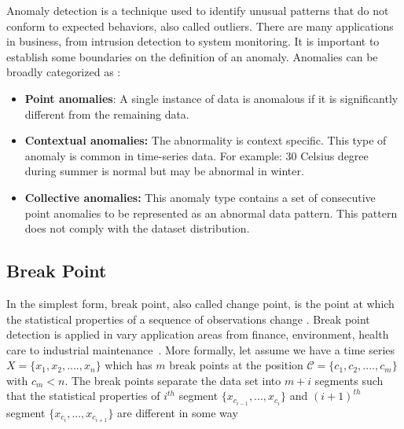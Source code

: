 Anomaly detection is a technique used to identify unusual patterns that do not conform to expected behaviors, also called outliers. There are many applications in business, from intrusion detection to system monitoring. It is important to establish some boundaries on the definition of an anomaly. Anomalies can be broadly categorized as \cite{chandola2009anomaly}:
\begin{itemize}
	\item \textbf{Point anomalies}: A single instance of data is anomalous if it is significantly different from the remaining data.
	\item \textbf{Contextual anomalies:} The abnormality is context specific. This type of anomaly is common in time-series data. For example: 30 Celsius degree during summer is normal but may be abnormal in winter.
	\item \textbf{Collective anomalies:} This anomaly type contains a set of consecutive point anomalies to be represented as an abnormal data pattern. This pattern does not comply with the dataset distribution.
\end{itemize}

\subsection{Break Point}
In the simplest form, break point, also called change point, is the point at which the statistical properties of a sequence of observations change \cite{killick2014changepoint}. Break point detection is applied in vary application areas from finance, environment, health care to industrial maintenance~\cite{liu2013change}\cite{kawahara2009change}\cite{guralnik1999event}. More formally, let assume we have a time series $ X = \{x_1, x_2, ...., x_n\}$ which has $ m $ break points at the position $ \mathcal{C} = \{ c_1, c_2, ...., c_m \} $ with $ c_m < n $. The break points separate the data set into $ m + i $ segments such that the statistical properties of $ i^{th} $ segment $ \{ x_{c_{i-1}}, ... , x_{c_i} \} $ and $ (i+1)^{th} $ segment $ \{ x_{c_{i}}, ... , x_{c_{i+1}} \} $ are different in some way


